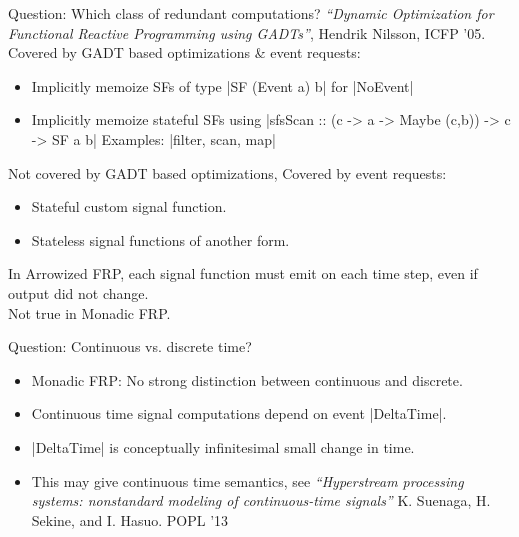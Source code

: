 \documentclass{beamer}
\begin{document}
\begin{frame}{Question: Which class of redundant computations?}
\emph{``Dynamic Optimization for Functional Reactive Programming
using GADTs''}, Hendrik Nilsson, ICFP '05.\\

Covered by GADT based optimizations \& event requests:
\begin{itemize}
\item Implicitly memoize SFs of type |SF (Event a) b| for |NoEvent|
\item Implicitly memoize stateful SFs using
|sfsScan :: (c -> a -> Maybe (c,b)) -> c -> SF a b|
Examples: |filter, scan, map|
\end{itemize}
Not covered by GADT based optimizations, Covered by event requests:
\begin{itemize}
\item Stateful custom signal function.
\item Stateless signal functions of another form.
\end{itemize}

In Arrowized FRP, each signal function must emit on each time step, even if output did not change. \\Not true in Monadic FRP.

\end{frame}

\begin{frame}{Question: Continuous vs. discrete time?}
\begin{itemize}
\item Monadic FRP: No strong distinction between continuous and discrete.
\item Continuous time signal computations depend on event |DeltaTime|.
\item |DeltaTime| is conceptually infinitesimal small change in time.
\item This may give continuous time semantics, see \emph{``Hyperstream processing
systems: nonstandard modeling of continuous-time signals''} K. Suenaga, H. Sekine, and I. Hasuo. POPL '13
\end{itemize}


\end{frame}
\backupend
\end{document}
